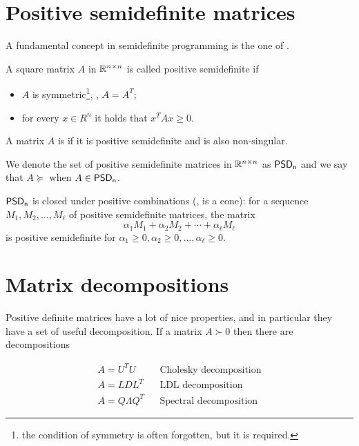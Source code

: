 \documentclass[a4paper,twoside,justified]{tufte-handout}
\begin{document}
 

\section{Positive semidefinite matrices}

A fundamental concept in semidefinite programming is the one of
. 
\begin{definition}
  A square matrix $A$ in $ \mathbb{R}^{n\times n} $ is called positive
  semidefinite if 
  \begin{itemize}
    \item $A$ is symmetric\footnote{the condition of symmetry is often
      forgotten, but it is required.}, \ie, $ A=A^{T} $;
    \item for every $ x\in R^{n} $ it holds that $ x^{T} A x \geq 0 $.
  \end{itemize}
  A matrix $ A $ is  if it is
  positive semidefinite and is also non-singular.
\end{definition}
We denote the set of positive semidefinite matrices in $\mathbb{R}^{n\times
  n}$ as $\mathsf{PSD_{n}}$ and we say that $ A\succeq $ when $ A
\in \mathsf{PSD_{n}} $.

\begin{fact}
  $ \mathsf{PSD_{n}} $ is closed under positive
  combinations (\ie, is a cone): for a sequence $ M_{1}, M_{2}, \ldots, M_{\ell} $ of positive
  semidefinite matrices, the matrix 
\begin{equation}
  \alpha_{1} M_{1} + \alpha_{2} M_{2} + \cdots + \alpha_{\ell} M_{\ell}
\end{equation}
is positive semidefinite for $ \alpha_{1}\geq 0, \alpha_{2}\geq 0,
\ldots , \alpha_{\ell} \geq 0$.
\end{fact}

\section{Matrix decompositions}

Positive definite matrices have a lot of nice properties, and in
particular they have a set of useful decomposition. If a matrix $ A
\succ 0 $ then there are decompositions

\begin{align}
  A = U^{T}U & & \text{Cholesky decomposition}\\
  A = L D L^{T} & & \text{LDL decomposition}\\
  A = Q \Lambda Q^{T} & & \text{Spectral decomposition}
\end{align}
\end{document}
